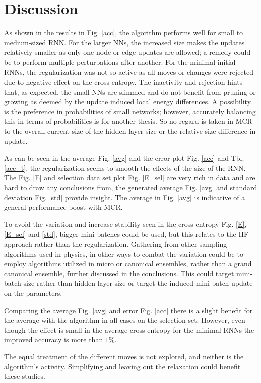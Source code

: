 \chapter{Discussion}

As shown in the results in Fig. \ref{acc}, the algorithm performs well for small to medium-sized RNN. For the larger NNs, the increased size makes the updates relatively smaller as only one node or edge updates are allowed; a remedy could be to perform multiple perturbations after another. For the minimal initial RNNs, the regularization was not so active as all moves or changes were rejected due to negative effect on the cross-entropy. The inactivity and rejection hints that, as expected, the small NNs are slimmed and do not benefit from pruning or growing as deemed by the update induced local energy differences. A possibility is the preference in probabilities of small networks; however, accurately balancing this in terms of probabilities is for another thesis. So no regard is taken in MCR to the overall current size of the hidden layer size or the relative size difference in update.

As can be seen in the average Fig. \ref{avg} and the error plot Fig. \ref{acc} and Tbl. \ref{acc_t}, the regularization seems to smooth the effects of the size of the RNN. The Fig. \ref{E} and selection data set plot Fig. \ref{E_sel} are very rich in data and are hard to draw any conclusions from, the generated average Fig. \ref{avg} and standard deviation Fig. \ref{std} provide insight. The average in Fig. \ref{avg} is indicative of a general performance boost with MCR.

To avoid the variation and increase stability seen in the cross-entropy Fig. \ref{E}, \ref{E_sel} and \ref{std}, bigger mini-batches could be used, but this relates to the HF approach rather than the regularization. Gathering from other sampling algorithms used in physics, in other ways to combat the variation could be to employ algorithms utilized in micro or canonical ensembles, rather than a grand canonical ensemble, further discussed in the conclusions. This could target mini-batch size rather than hidden layer size or target the induced mini-batch update on the parameters.

Comparing the average Fig. \ref{avg} and error Fig. \ref{acc} there is a slight benefit for the average with the algorithm in all cases on the selection set. However, even though the effect is small in the average cross-entropy for the minimal RNNs the improved accuracy is more than $1\%$.

The equal treatment of the different moves is not explored, and neither is the algorithm's activity. Simplifying and leaving out the relaxation could benefit these studies. 

